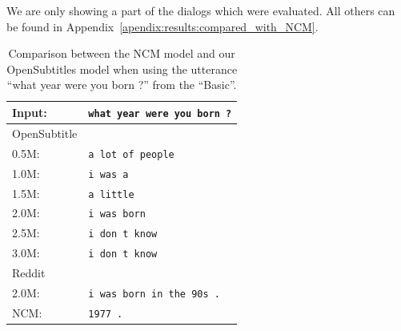 We are only showing a part of the dialogs which were evaluated. All others can be found in Appendix~\ref{apendix:results:compared_with_NCM}.
\\
\begin{table}[H]
	\centering
	\begin{adjustbox}{max width=\textwidth}
		\begin{tabular}{ll}
			\toprule
			Input: 	& \texttt{what year were you born ?}\\
			\midrule
			OpenSubtitle\\
			0.5M: 	& \texttt{a lot of people}\\
			1.0M: 	& \texttt{i was a}\\
			1.5M:	& \texttt{a little}\\
			2.0M:	& \texttt{i was born}\\
			2.5M:	& \texttt{i don t know}\\
			3.0M:	& \texttt{i don t know}\\
			\midrule
			Reddit\\
			2.0M:	& \texttt{i was born in the 90s .}\\
			\midrule
			NCM:	& \texttt{1977 .}\\
			\bottomrule
		\end{tabular}
	\end{adjustbox}
	\caption{Comparison between the NCM model and our OpenSubtitles model when using the utterance ``what year were you born ?'' from the ``Basic''.}
	\label{results:example8_output:Neural_Conversational_Model_compared}
\end{table}


